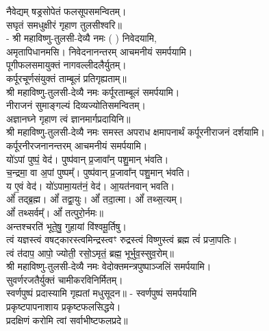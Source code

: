 नैवेद्यम् षड्रसोपेतं फलसूपसमन्वितम्।\\
सघृतं समधुक्षीरं गृहाण तुलसीश्वरि॥\\
- श्री महाविष्णु-तुलसी-देव्यै नमः (	) निवेदयामि, \\
अमृतापिधानमसि। निवेदनानन्तरम् आचमनीयं समर्पयामि।\\

पूगीफलसमायुक्तं नागवल्लीदलैर्युतम्।\\
कर्पूरचूर्णसंयुक्तं ताम्बूलं प्रतिगृह्यताम्॥\\
श्री महाविष्णु-तुलसी-देव्यै नमः कर्पूरताम्बूलं समर्पयामि।\\

नीराजनं सुमाङ्गल्यं दिव्यज्योतिसमन्वितम्।\\
अज्ञानघ्ने गृहाण त्वं ज्ञानमार्गप्रदायिनि॥\\
श्री महाविष्णु-तुलसी-देव्यै नमः समस्त अपराध क्षमापनार्थं कर्पूरनीराजनं दर्शयामि।\\
कर्पूरनीरजनानन्तरम् आचमनीयं समर्पयामि।\\

यो॑ऽपां पुष्पं॒ वेद॑। पुष्प॑वान् प्र॒जावा᳚न् पशु॒मान् भ॑वति।\\
च॒न्द्रमा॒ वा अ॒पां पुष्पम्᳚। पुष्प॑वान् प्र॒जावा᳚न् पशु॒मान् भ॑वति।\\
य ए॒वं वेद॑। यो॑ऽपामा॒यत॑नं॒ वेद॑। आ॒यत॑नवान् भवति।\\

ओं᳚ तद्ब्र॒ह्म। ओं᳚ तद्वा॒युः। ओं᳚ तदा॒त्मा। ओं᳚ तथ्स॒त्यम्‌।\\
ओं᳚ तथ्सर्वम्᳚‌। ओं᳚ तत्पुरो॒र्नमः॥\\

अन्तश्चरति॑ भूते॒षु॒ गुहायां वि॑श्वमू॒र्तिषु। \\
त्वं यज्ञस्त्वं वषट्कारस्त्वमिन्द्रस्त्वꣳ रुद्रस्त्वं विष्णुस्त्वं ब्रह्म त्वं॑ प्रजा॒पतिः। \\
त्वं त॑दाप॒ आपो॒ ज्योती॒ रसो॒ऽमृतं॒ ब्रह्म॒ भूर्भुव॒स्सुव॒रोम्‌॥\\

श्री महाविष्णु-तुलसी-देव्यै नमः वेदोक्तमन्त्रपुष्पाञ्जलिं समर्पयामि।\\

सुवर्णरजतैर्युक्तं चामीकरविनिर्मितम्।\\
स्वर्णपुष्पं प्रदास्यामि गृह्यतां मधुसूदन॥ - स्वर्णपुष्पं समर्पयामि\\

प्रकृष्टपापनाशाय प्रकृष्टफलसिद्धये।\\
प्रदक्षिणं करोमि त्वां सर्वाभीष्टफलप्रदे॥\\


